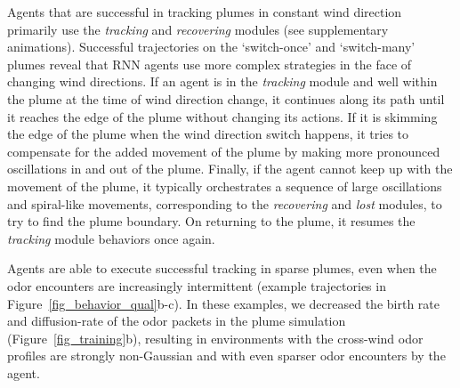 \documentclass[5p,twocolumn,authoryear]{elsarticle}
\begin{document}
Agents that are successful in tracking plumes in constant wind direction primarily use the \textit{tracking} and \textit{recovering} modules (see supplementary animations).
Successful trajectories on the `switch-once' and `switch-many' plumes reveal that RNN agents use more complex strategies in the face of changing wind directions.
If an agent is in the \textit{tracking} module and well within the plume at the time of wind direction change, it continues along its path until it reaches the edge of the plume without changing its actions.
If it is skimming the edge of the plume when the wind direction switch happens, it tries to compensate for the added movement of the plume by making more pronounced oscillations in and out of the plume.
Finally, if the agent cannot keep up with the movement of the plume, it typically orchestrates a sequence of large oscillations and spiral-like movements, corresponding to the \textit{recovering} and \textit{lost} modules, to try to find the plume boundary.
On returning to the plume, it resumes the \textit{tracking} module behaviors once again.

Agents are able to execute successful tracking in sparse plumes, even when the odor encounters are increasingly intermittent (example trajectories in Figure~\ref{fig_behavior_qual}b-c). 
In these examples, we decreased the birth rate and diffusion-rate of the odor packets in the plume simulation (Figure~\ref{fig_training}b), resulting in environments with the cross-wind odor profiles are strongly non-Gaussian and with even sparser odor encounters by the agent.
\end{document}
